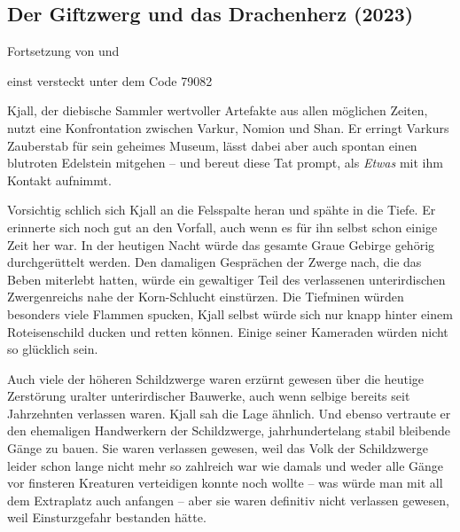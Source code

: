 \begin{chapterbox}
    \chapter{Der Giftzwerg und das Drachenherz (2023)}
    \label{Der Giftzwerg und das Drachenherz (2023)}

    \begin{center}
        Fortsetzung von  und 
        
        einst versteckt unter dem Code 79082
    \end{center}
    
    Kjall, der diebische Sammler wertvoller Artefakte aus allen möglichen Zeiten, nutzt eine Konfrontation zwischen Varkur, Nomion und Shan. Er erringt Varkurs Zauberstab für sein geheimes Museum, lässt dabei aber auch spontan einen blutroten Edelstein mitgehen – und bereut diese Tat prompt, als \textit{Etwas} mit ihm Kontakt aufnimmt.
\end{chapterbox}


Vorsichtig schlich sich Kjall an die Felsspalte heran und spähte in die Tiefe. Er erinnerte sich noch gut an den Vorfall, auch wenn es für ihn selbst schon einige Zeit her war. In der heutigen Nacht würde das gesamte Graue Gebirge gehörig durchgerüttelt werden. Den damaligen Gesprächen der Zwerge nach, die das Beben miterlebt hatten, würde ein gewaltiger Teil des verlassenen unterirdischen Zwergenreichs nahe der Korn-Schlucht einstürzen. Die Tiefminen würden besonders viele Flammen spucken, Kjall selbst würde sich nur knapp hinter einem Roteisenschild ducken und retten können. Einige seiner Kameraden würden nicht so glücklich sein.

Auch viele der höheren Schildzwerge waren erzürnt gewesen über die heutige Zerstörung uralter unterirdischer Bauwerke, auch wenn selbige bereits seit Jahrzehnten verlassen waren. Kjall sah die Lage ähnlich. Und ebenso vertraute er den ehemaligen Handwerkern der Schildzwerge, jahrhundertelang stabil bleibende Gänge zu bauen. Sie waren verlassen gewesen, weil das Volk der Schildzwerge leider schon lange nicht mehr so zahlreich war wie damals und weder alle Gänge vor finsteren Kreaturen verteidigen konnte noch wollte – was würde man mit all dem Extraplatz auch anfangen – aber sie waren definitiv nicht verlassen gewesen, weil Einsturzgefahr bestanden hätte.

